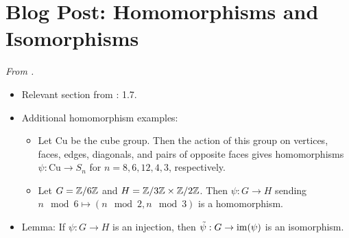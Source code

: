 \documentclass[../notes.tex]{subfiles}
\begin{document}
\section{Blog Post: Homomorphisms and Isomorphisms}
\emph{From \textcite{bib:Calegari}.}
\begin{itemize}
    \item {}Relevant section from \textcite{bib:DummitFoote}: 1.7.
    \item Additional homomorphism examples:
    \begin{itemize}
        \item Let $\text{Cu}$ be the cube group. Then the action of this group on vertices, faces, edges, diagonals, and pairs of opposite faces gives homomorphisms $\psi:\text{Cu}\to S_n$ for $n=8,6,12,4,3$, respectively.
        \item Let $G=\mathbb{Z}/6\mathbb{Z}$ and $H=\mathbb{Z}/3\mathbb{Z}\times\mathbb{Z}/2\mathbb{Z}$. Then $\psi:G\to H$ sending $n\mod 6\mapsto(n\mod 2,n\mod 3)$ is a homomorphism.
    \end{itemize}
    \item Lemma: If $\psi:G\to H$ is an injection, then $\tilde{\psi}:G\to\operatorname{im}(\psi)$ is an isomorphism.
\end{itemize}
\end{document}
